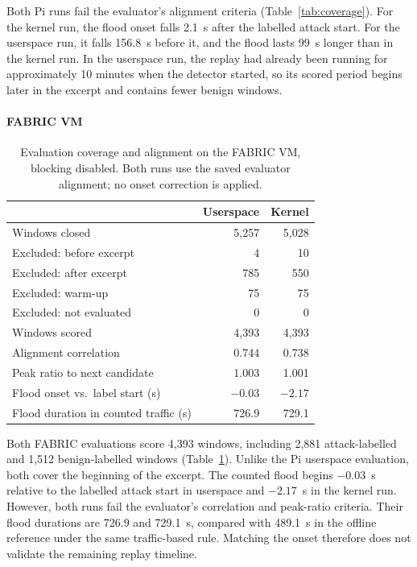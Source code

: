 Both Pi runs fail the evaluator's alignment criteria (Table~\ref{tab:coverage}).
For the kernel run, the flood onset falls 2.1~s after the labelled attack
start. For the userspace run, it falls 156.8~s before it, and the flood
lasts 99~s longer than in the kernel run. In the userspace run, the replay
had already been running for approximately 10 minutes when the
detector started, so its scored period begins later in the excerpt and
contains fewer benign windows.

\paragraph{FABRIC VM}

\begin{table}[H]
  \centering
  \small
  \begin{tabular}{@{}lrr@{}}
    \toprule
    & Userspace & Kernel \\
    \midrule
    Windows closed & 5,257 & 5,028 \\
    Excluded: before excerpt & 4 & 10 \\
    Excluded: after excerpt & 785 & 550 \\
    Excluded: warm-up & 75 & 75 \\
    Excluded: not evaluated & 0 & 0 \\
    Windows scored & 4,393 & 4,393 \\
    Alignment correlation & 0.744 & 0.738 \\
    Peak ratio to next candidate & 1.003 & 1.001 \\
    Flood onset vs.\ label start (s) & $-0.03$ & $-2.17$ \\
    Flood duration in counted traffic (s) & 726.9 & 729.1 \\
    \bottomrule
  \end{tabular}
  \caption{Evaluation coverage and alignment on the FABRIC VM, blocking disabled. Both runs use the saved evaluator alignment; no onset correction is applied.}
  \label{tab:fabric-coverage}
\end{table}

Both FABRIC evaluations score 4,393 windows, including 2,881 attack-labelled
and 1,512 benign-labelled windows (Table~\ref{tab:fabric-coverage}). Unlike
the Pi userspace evaluation, both cover the beginning of the excerpt.
The counted flood begins $-0.03$~s relative to the labelled attack start in
userspace and $-2.17$~s in the kernel run. However, both runs fail the evaluator's
correlation and peak-ratio criteria. Their flood durations are 726.9 and
729.1~s, compared with 489.1~s in the offline reference under the same
traffic-based rule. Matching the onset therefore does not validate the
remaining replay timeline.

